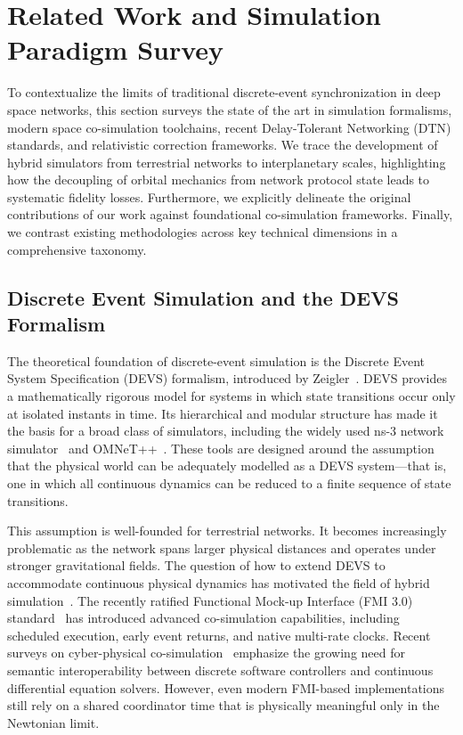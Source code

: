 \documentclass[a4paper,fleqn]{cas-sc}
\begin{document}
\section{Related Work and Simulation Paradigm Survey}
\label{sec:related}

To contextualize the limits of traditional discrete-event synchronization in deep space networks, this section surveys the state of the art in simulation formalisms, modern space co-simulation toolchains, recent Delay-Tolerant Networking (DTN) standards, and relativistic correction frameworks. We trace the development of hybrid simulators from terrestrial networks to interplanetary scales, highlighting how the decoupling of orbital mechanics from network protocol state leads to systematic fidelity losses. Furthermore, we explicitly delineate the original contributions of our work against foundational co-simulation frameworks. Finally, we contrast existing methodologies across key technical dimensions in a comprehensive taxonomy.

\subsection{Discrete Event Simulation and the DEVS Formalism}
The theoretical foundation of discrete-event simulation is the Discrete Event System Specification (DEVS) formalism, introduced by Zeigler~\cite{zeigler2000}. DEVS provides a mathematically rigorous model for systems in which state transitions occur only at isolated instants in time. Its hierarchical and modular structure has made it the basis for a broad class of simulators, including the widely used ns-3 network simulator~\cite{ns3} and OMNeT++~\cite{omnet}. These tools are designed around the assumption that the physical world can be adequately modelled as a DEVS system---that is, one in which all continuous dynamics can be reduced to a finite sequence of state transitions.

This assumption is well-founded for terrestrial networks. It becomes increasingly problematic as the network spans larger physical distances and operates under stronger gravitational fields. The question of how to extend DEVS to accommodate continuous physical dynamics has motivated the field of hybrid simulation~\cite{hybrid_sim_review}. The recently ratified Functional Mock-up Interface (FMI 3.0) standard~\cite{fmi3_standard} has introduced advanced co-simulation capabilities, including scheduled execution, early event returns, and native multi-rate clocks. Recent surveys on cyber-physical co-simulation~\cite{gomes_cosim_survey_2018} emphasize the growing need for semantic interoperability between discrete software controllers and continuous differential equation solvers. However, even modern FMI-based implementations still rely on a shared coordinator time that is physically meaningful only in the Newtonian limit.
\end{document}
